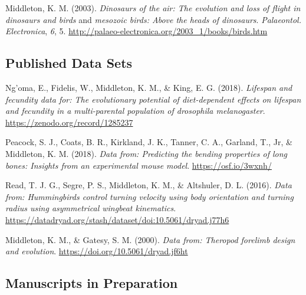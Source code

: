 \documentclass[11pt, a4paper]{awesome-cv}
\begin{document}
\begingroup
\setlength{\parindent}{-0.5in}
\setlength{\leftskip}{0.5in}

\hypertarget{refs_bookreviews}{}
\leavevmode\hypertarget{ref-middleton_dinosaurs_2003}{}%
Middleton, K. M. (2003). \emph{Dinosaurs of the air: The evolution and
loss of flight in dinosaurs and birds} and \emph{mesozoic birds: Above
the heads of dinosaurs}. \emph{Palaeontol. Electronica}, \emph{6}, 5.
\url{http://palaeo-electronica.org/2003_1/books/birds.htm}

\endgroup

\hypertarget{published-data-sets}{%
\subsection{Published Data Sets}\label{published-data-sets}}

\begingroup
\setlength{\parindent}{-0.5in}
\setlength{\leftskip}{0.5in}

\hypertarget{refs_datasets}{}
\leavevmode\hypertarget{ref-Ngoma2018-kf}{}%
Ng'oma, E., Fidelis, W., Middleton, K. M., \& King, E. G. (2018).
\emph{Lifespan and fecundity data for: The evolutionary potential of
diet-dependent effects on lifespan and fecundity in a multi-parental
population of \textup{drosophila melanogaster}}.
\url{https://zenodo.org/record/1285237}

\leavevmode\hypertarget{ref-Peacock2018-lc}{}%
Peacock, S. J., Coats, B. R., Kirkland, J. K., Tanner, C. A., Garland,
T., Jr, \& Middleton, K. M. (2018). \emph{Data from: Predicting the
bending properties of long bones: Insights from an experimental mouse
model}. \url{https://osf.io/3wxnh/}

\leavevmode\hypertarget{ref-read_data_2016}{}%
Read, T. J. G., Segre, P. S., Middleton, K. M., \& Altshuler, D. L.
(2016). \emph{Data from: Hummingbirds control turning velocity using
body orientation and turning radius using asymmetrical wingbeat
kinematics}.
\url{https://datadryad.org/stash/dataset/doi:10.5061/dryad.j77h6}

\leavevmode\hypertarget{ref-middleton_data_2000}{}%
Middleton, K. M., \& Gatesy, S. M. (2000). \emph{Data from: Theropod
forelimb design and evolution}.
\url{https://doi.org/10.5061/dryad.jf6ht}

\endgroup

\hypertarget{manuscripts-in-preparation}{%
\subsection{Manuscripts in
Preparation}\label{manuscripts-in-preparation}}
\end{document}
